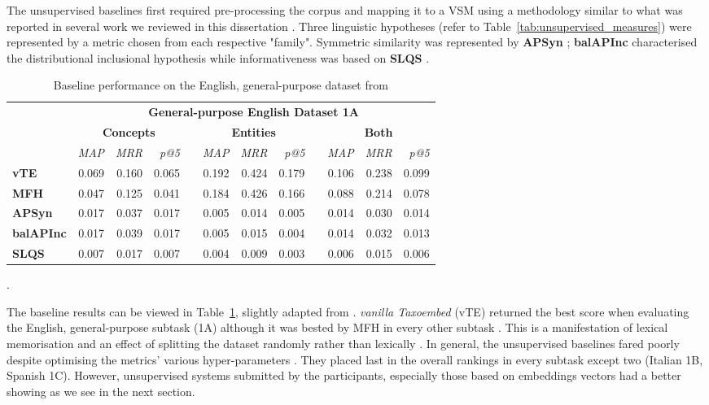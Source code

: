 The unsupervised baselines first required pre-processing the corpus and mapping it to a \ac{VSM} using a methodology similar to what was reported in several work we reviewed in this dissertation \citep{shwartz2017siege, santus2014chasing, roller2014inclusive}.  Three linguistic hypotheses (refer to Table~\ref{tab:unsupervised_measures}) were represented by a metric chosen from each respective "family". Symmetric similarity was represented by \textbf{APSyn} \citep{santus2016unsupervised}; \textbf{balAPInc} \citep{kotlerman2010directional} characterised the distributional inclusional hypothesis while informativeness was based on \textbf{SLQS} \citep{santus2014chasing}.

\begin{table}\centering
    \begin{tabular}{@{}lrrrcrrrcrrr@{}} \toprule
    & \multicolumn{11}{c}{\textbf{General-purpose English Dataset 1A}} \\
    \cmidrule{2-12}
    & \multicolumn{3}{c}{\textbf{Concepts}} & \phantom{a} & \multicolumn{3}{c}{\textbf{Entities}} & \phantom{a} & \multicolumn{3}{c}{\textbf{Both}} \\ 
    \cmidrule{2-4} \cmidrule{6-8} \cmidrule{10-12}
    & \textit{MAP} & \textit{MRR} & \textit{p@5} && 
      \textit{MAP} & \textit{MRR} & \textit{p@5} && 
      \textit{MAP} & \textit{MRR} & \textit{p@5} \\  \midrule
    \textbf{vTE} & 0.069 & 0.160 & 0.065 && 0.192 & 0.424 & 0.179 && 0.106 & 0.238 & 0.099 \\
    \textbf{MFH} & 0.047 & 0.125 & 0.041 && 0.184 & 0.426 & 0.166 && 0.088 & 0.214 & 0.078 \\
    \textbf{APSyn} & 0.017 & 0.037 & 0.017 && 0.005 & 0.014 & 0.005 && 0.014 & 0.030 & 0.014 \\
    \textbf{balAPInc} & 0.017 & 0.039 & 0.017 && 0.005 & 0.015 & 0.004 && 0.014 & 0.032 & 0.013 \\
    \textbf{SLQS} & 0.007 & 0.017 & 0.007 && 0.004 & 0.009 & 0.003 && 0.006 & 0.015 & 0.006 \\
    \bottomrule
    \end{tabular}
    \caption{Baseline performance on the English, general-purpose dataset from \citep{camacho2018semeval}}.\label{tab:semeval_baseline}
\end{table}

The baseline results can be viewed in Table~\ref{tab:semeval_baseline}, slightly adapted from \citep{camacho2018semeval}.  \textit{vanilla Taxoembed} (vTE) returned the best score when evaluating the English, general-purpose subtask (1A) although it was bested by MFH in every other subtask \citep{camacho2018semeval}.  This is a manifestation of lexical memorisation and an effect of splitting the dataset randomly rather than lexically \citep{levy2014dependency}.  In general, the unsupervised baselines fared poorly despite optimising the metrics' various hyper-parameters \citep{camacho2018semeval}.  They placed last in the overall rankings in every subtask except two (Italian 1B, Spanish 1C).  However, unsupervised systems submitted by the participants, especially those based on embeddings vectors had a better showing as we see in the next section.

